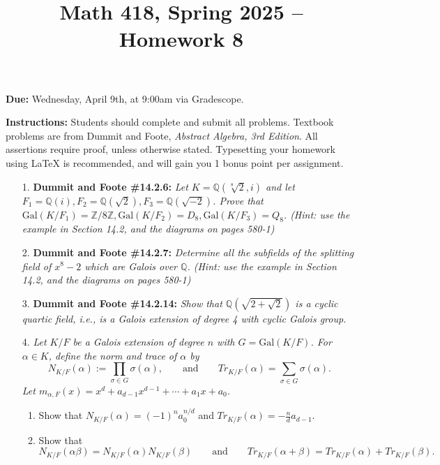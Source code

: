 \documentclass[12pt]{article}
\title{Math 418, Spring 2025 -- Homework 8}
\date{}
\newcommand{\Z}{\mathbb{Z}}
\newcommand{\Q}{\mathbb{Q}}
\newcommand{\Gal}{\text{Gal}}
\begin{document}
 \maketitle
\vspace{-80pt}

\textbf{Due:} Wednesday, April 9th, at 9:00am via Gradescope.

\textbf{Instructions:} Students should complete and submit all problems. Textbook problems are from Dummit and Foote, \emph{Abstract Algebra, 3rd Edition}. All assertions require proof, unless otherwise stated. Typesetting your homework using LaTeX is recommended, and will gain you 1 bonus point per assignment.

\begin{enumerate}

\item[1.] \textbf{Dummit and Foote \#14.2.6:} \textit{Let $K = \Q(\sqrt[8]{2}, i)$ and let $F_1 = \Q(i), F_2 = \Q(\sqrt{2}) , F_3 = \Q(\sqrt{-2})$. Prove that $\Gal(K/F_1) = \Z/8\Z, \Gal(K/F_2) = D_8, \Gal(K/F_3) = Q_8$. (Hint: use the example in Section 14.2, and the diagrams on pages 580-1)}

\item[2.] \textbf{Dummit and Foote \#14.2.7:} \textit{Determine all the subfields of the splitting field of $x^8 - 2$ which are Galois over $\Q$. (Hint: use the example in Section 14.2, and the diagrams on pages 580-1)}

\item[3.] \textbf{Dummit and Foote \#14.2.14:} \textit{Show that $\Q(\sqrt{2+\sqrt{2}})$ is a cyclic quartic field, i.e., is a Galois extension of degree 4 with
cyclic Galois group.}

\item[4.] \textit{Let $K/F$ be a Galois extension of degree $n$ with $G = \Gal(K/F)$. For $\alpha\in K$, define the norm and trace of $\alpha$ by \[N_{K/F}(\alpha) := \prod_{\sigma\in G} \sigma(\alpha), \qquad \text{and} \qquad Tr_{K/F}(\alpha) = \sum_{\sigma\in G} \sigma(\alpha).\] Let $m_{\alpha,F}(x) = x^d + a_{d-1}x^{d-1} + \cdots + a_1x + a_0$.}

\begin{enumerate}
    \item Show that $N_{K/F}(\alpha) = (-1)^n a_0^{n/d}$ and $Tr_{K/F}(\alpha) = -\frac{n}{d}a_{d-1}$.

    \item Show that \[N_{K/F}(\alpha\beta) = N_{K/F}(\alpha)N_{K/F}(\beta)\qquad \text{and} \qquad Tr_{K/F}(\alpha+\beta) = Tr_{K/F}(\alpha)+Tr_{K/F}(\beta).\]


\end{enumerate}
\end{enumerate}
\end{document}
